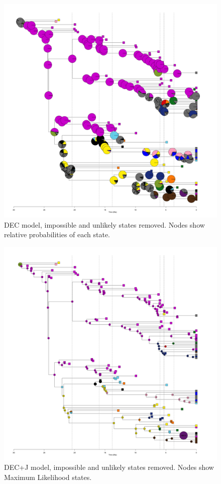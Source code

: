 \documentclass[a4paper, 12pt]{article}
\begin{document}
\begin{figure}[H]
 \centering
  \includegraphics[width = \linewidth]{figures/all-pinnipeds-DEC-unlikely-pies.png}
  \caption{DEC model, impossible and unlikely states removed. Nodes show relative probabilities of each state.}
  \label{fig-all-dec-pie-unlikely}
\end{figure} 

\begin{figure}[H]
 \centering
  \includegraphics[width = \linewidth]{figures/all-pinnipeds-DECj-unlikely-MLstates.png}
  \caption{DEC+J model, impossible and unlikely states removed. Nodes show Maximum Likelihood states.}
  \label{fig-all-decj-ml-unlikely}
\end{figure} 
\end{document}
